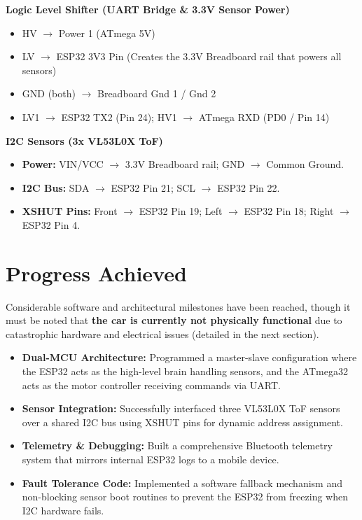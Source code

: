 \documentclass[12pt,a4paper]{article}
\begin{document}
\textbf{Logic Level Shifter (UART Bridge \& 3.3V Sensor Power)}
\begin{itemize}
    \item HV $\rightarrow$ Power 1 (ATmega 5V)
    \item LV $\rightarrow$ ESP32 3V3 Pin (Creates the 3.3V Breadboard rail that powers all sensors)
    \item GND (both) $\rightarrow$ Breadboard Gnd 1 / Gnd 2
    \item LV1 $\rightarrow$ ESP32 TX2 (Pin 24); HV1 $\rightarrow$ ATmega RXD (PD0 / Pin 14)
\end{itemize}

\textbf{I2C Sensors (3x VL53L0X ToF)}
\begin{itemize}
    \item \textbf{Power:} VIN/VCC $\rightarrow$ 3.3V Breadboard rail; GND $\rightarrow$ Common Ground.
    \item \textbf{I2C Bus:} SDA $\rightarrow$ ESP32 Pin 21; SCL $\rightarrow$ ESP32 Pin 22.
    \item \textbf{XSHUT Pins:} Front $\rightarrow$ ESP32 Pin 19; Left $\rightarrow$ ESP32 Pin 18; Right $\rightarrow$ ESP32 Pin 4.
\end{itemize}

\section{Progress Achieved}
Considerable software and architectural milestones have been reached, though it must be noted that \textbf{the car is currently not physically functional} due to catastrophic hardware and electrical issues (detailed in the next section). 

\begin{itemize}
    \item \textbf{Dual-MCU Architecture:} Programmed a master-slave configuration where the ESP32 acts as the high-level brain handling sensors, and the ATmega32 acts as the motor controller receiving commands via UART.
    \item \textbf{Sensor Integration:} Successfully interfaced three VL53L0X ToF sensors over a shared I2C bus using XSHUT pins for dynamic address assignment.
    \item \textbf{Telemetry \& Debugging:} Built a comprehensive Bluetooth telemetry system that mirrors internal ESP32 logs to a mobile device.
    \item \textbf{Fault Tolerance Code:} Implemented a software fallback mechanism and non-blocking sensor boot routines to prevent the ESP32 from freezing when I2C hardware fails.
\end{itemize}
\end{document}

